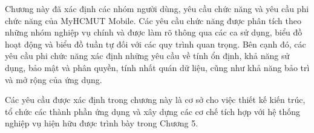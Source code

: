 Chương này đã xác định các nhóm người dùng, yêu cầu chức năng và yêu cầu phi chức năng của MyHCMUT Mobile. Các yêu cầu chức năng được phân tích theo những nhóm nghiệp vụ chính và được làm rõ thông qua các ca sử dụng, biểu đồ hoạt động và biểu đồ tuần tự đối với các quy trình quan trọng. Bên cạnh đó, các yêu cầu phi chức năng xác định những yêu cầu về tính ổn định, khả năng sử dụng, bảo mật và phân quyền, tính nhất quán dữ liệu, cũng như khả năng bảo trì và mở rộng của ứng dụng.

Các yêu cầu được xác định trong chương này là cơ sở cho việc thiết kế kiến trúc, tổ chức các thành phần ứng dụng và xây dựng các cơ chế tích hợp với hệ thống nghiệp vụ hiện hữu được trình bày trong Chương 5.
